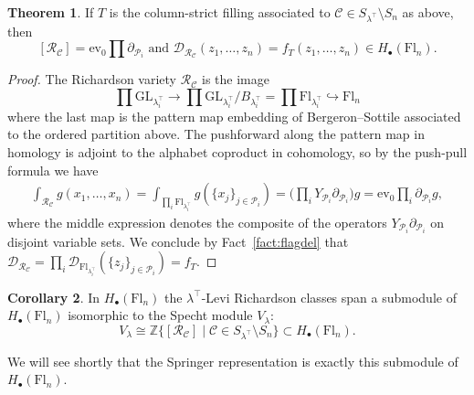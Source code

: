 \documentclass[11pt]{amsart}
\theoremstyle{definition}
\newtheorem{thm}{Theorem}[section]
\newtheorem{cor}[thm]{Corollary}
\numberwithin{equation}{section}
\newcommand{\suchthat}{\;|\;}
\newcommand{\ct}{\operatorname{ev_0}} %
\newcommand{\fl}[1]{\mathrm{Fl}_{#1}}
\newcommand{\GL}{\mathrm{GL}}
\begin{document}
\begin{thm}
\label{thm:RCcohomology}
    If $T$ is the column-strict filling associated to $\mathcal{C}\in S_{\lambda^{\top}}\setminus S_n$ as above, then $$[\mathcal{R}_{\mathcal{C}}]=\ct \prod \partial_{\mathcal{P}_i}\text{ and }\mathcal{D}_{\mathcal{R}_{\mathcal{C}}}(z_1,\ldots,z_n)=f_T(z_1,\ldots,z_n)\in H_\bullet(\fl{n}).$$
\end{thm}
\begin{proof}
The Richardson variety $\mathcal{R}_{\mathcal{C}}$ is the image
$$\prod \GL_{\lambda_{i}^{\top}}\to \prod \GL_{\lambda_{i}^{\top}}/B_{\lambda_{i}^{\top}}=\prod \fl{\lambda_{i}^{\top}}\hookrightarrow \fl{n}$$
where the last map is the pattern map embedding of Bergeron--Sottile \cite{BS98,BS99} associated to the ordered partition above.
   The pushforward along the pattern map in homology is adjoint to the alphabet coproduct in cohomology, so by the push-pull formula we have
     \begin{align*}\int_{\mathcal{R}_{\mathcal{C}}}g(x_1,\ldots,x_n)=\int_{\prod_i \fl{\lambda_{i}^{\top}}}g(\{x_j\}_{j\in \mathcal{P}_i})=\Big(\prod_i Y_{\mathcal{P}_i}\partial_{\mathcal{P}_i}\Big)g=\ct \prod_i \partial_{\mathcal{P}_i}g,\end{align*}
    where the middle expression denotes the composite of the operators $Y_{\mathcal{P}_i}\partial_{\mathcal{P}_i}$ on disjoint variable sets.
    We conclude by Fact~\ref{fact:flagdel} that $\mathcal{D}_{\mathcal{R}_\mathcal{C}}=\prod_i \mathcal{D}_{\fl{\lambda_i^{\top}}}(\{z_j\}_{j\in\mathcal{P}_i})=f_T$.
\end{proof}
\begin{cor}
In $H_\bullet(\fl{n})$ the $\lambda^{\top}$-Levi Richardson classes span a submodule of $H_\bullet(\fl{n})$ isomorphic to the Specht module $V_{\lambda}$:
    $$V_\lambda\cong \mathbb{Z}\{[\mathcal{R}_{\mathcal{C}}]\suchthat \mathcal{C}\in S_{\lambda^{\top}}\setminus S_n\}\subset H_\bullet(\fl{n}).$$
\end{cor}
We will see shortly that the Springer representation is exactly this submodule of $H_\bullet(\fl{n})$.
\end{document}
